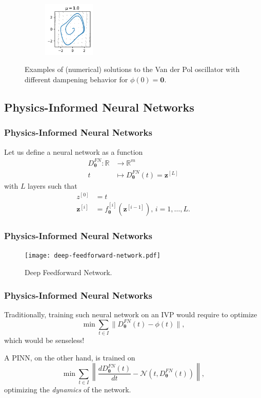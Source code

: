 \documentclass[t]{beamer}
\newcommand{\R}{\mathbb{R}}
\begin{document}
\begin{frame}
\begin{figure}[h]
\begin{subfigure}[b]{\textwidth}
	    \includegraphics[width=0.27\textwidth]{../images/vdp_statespace_mu_10.pdf}
	\end{subfigure}
	\caption{Examples of (numerical) solutions to the Van der Pol oscillator with different dampening behavior for $\phi(0)=\bm{0}$.}\label{fig:vdp_example}
    \end{figure}
\end{frame}

\subsection{Physics-Informed Neural Networks}

\begin{frame}
    \frametitle{Physics-Informed Neural Networks}
    Let us define a neural network as a function
    \begin{align*}
	D^{FN}_{\bm{\theta}}: \R &\longrightarrow \R^{m} \\
	t &\longmapsto 	D^{FN}_{\bm{\theta}}(	t) = \bm{z}^{[L]}
    \end{align*}
    with $L$ layers such that
    \begin{align*}
	z^{[0]} &= t \\
	\bm{z}^{[i]} &= f^{[i]}_{\bm{\theta}}\left( \bm{z}^{[i-1]} \right) ,\,i=1,\ldots,L
    .\end{align*}
\end{frame}

\begin{frame}
    \frametitle{Physics-Informed Neural Networks}

    \begin{figure}[h]
        \centering
        \texttt{[image: deep-feedforward-network.pdf]}
        \caption{Deep Feedforward Network.}
        \label{fig:deep-feedforward-network-pdf}
    \end{figure}
\end{frame}

\begin{frame}
    \frametitle{Physics-Informed Neural Networks}
    Traditionally, training such neural network on an IVP would require to optimize \[
    \min \sum_{t\in I} \|D^{FN}_{\bm{\theta}}(t) - \phi(t)\|
    ,\] 
    which would be senseless! \pause

    A PINN\cite{Raissi2019}, on the other hand, is trained on \[
    \min \sum_{t \in I} \left\|  \frac{d D^{FN}_{\bm{\theta}}(t)}{dt} - \mathcal{N}\left( t, D^{FN}_{\bm{\theta}}(t) \right) \right\| 
    ,\] 
    optimizing the \emph{dynamics} of the network.
\end{frame}
\end{document}
